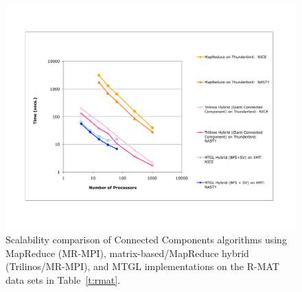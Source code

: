 \begin{figure}[htb]
\includegraphics[width=\textwidth]{fig_cc_big.pdf}
\caption{Scalability comparison of Connected Components algorithms using 
MapReduce (MR-MPI),
matrix-based/MapReduce hybrid (Trilinos/MR-MPI), and MTGL implementations
on the R-MAT data sets in Table~\ref{t:rmat}.}
\label{f:ccbig}
\end{figure}

